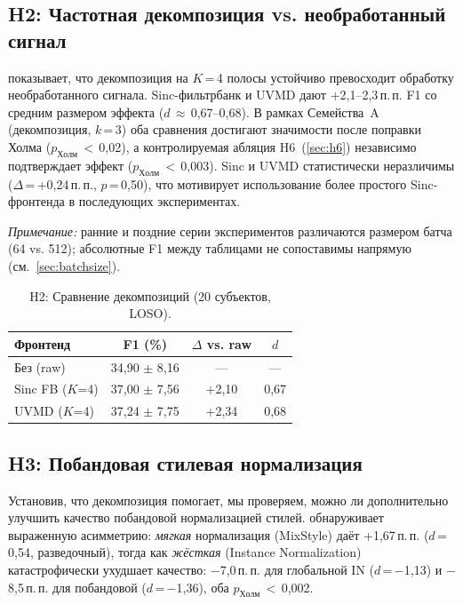 \documentclass[conference]{IEEEtran}
\newcommand{\pp}{\,п.\,п.}
\newcommand{\uvmd}{\textsc{UVMD}}
\begin{document}
\subsection{H2: Частотная декомпозиция vs. необработанный сигнал}

 показывает, что декомпозиция на $K$\,=\,4 полосы устойчиво превосходит обработку необработанного сигнала.
Sinc-фильтрбанк и \uvmd{} дают +2,1--2,3\pp{} F1 со средним размером эффекта ($d$\,$\approx$\,0,67--0,68).
В рамках Семейства~A (декомпозиция, $k$\,=\,3) оба сравнения достигают значимости после поправки Холма ($p_{\mathrm{Холм}}$\,$<$\,0,02), а контролируемая абляция H6~(\cref{sec:h6}) независимо подтверждает эффект ($p_{\mathrm{Холм}}$\,$<$\,0,003).
Sinc и \uvmd{} статистически неразличимы ($\Delta$\,=\,+0,24\pp{}, $p$\,=\,0,50), что мотивирует использование более простого Sinc-фронтенда в последующих экспериментах.

\emph{Примечание:} ранние и поздние серии экспериментов различаются размером батча (64 vs. 512); абсолютные F1 между таблицами не сопоставимы напрямую (см.~\cref{sec:batchsize}).

\begin{table}[t]
\centering
\caption{H2: Сравнение декомпозиций (20 субъектов, LOSO).}
\label{tab:h2}
\begin{tabular}{lccc}
\toprule
Фронтенд & F1 (\%) & $\Delta$ vs. raw & $d$ \\
\midrule
Без (raw) & 34,90 $\pm$ 8,16 & --- & --- \\
Sinc FB ($K$=4) & 37,00 $\pm$ 7,56 & +2,10 & 0,67 \\
\uvmd{} ($K$=4) & 37,24 $\pm$ 7,75 & +2,34 & 0,68 \\
\bottomrule
\end{tabular}
\end{table}

\subsection{H3: Побандовая стилевая нормализация}

Установив, что декомпозиция помогает, мы проверяем, можно ли дополнительно улучшить качество побандовой нормализацией стилей.
 обнаруживает выраженную асимметрию: \emph{мягкая} нормализация (MixStyle) даёт +1,67\pp{} ($d$\,=\,0,54, разведочный), тогда как \emph{жёсткая} (Instance Normalization) катастрофически ухудшает качество: $-$7,0\pp{} для глобальной IN ($d$\,=\,$-$1,13) и $-$8,5\pp{} для побандовой ($d$\,=\,$-$1,36), оба $p_{\mathrm{Холм}}$\,$<$\,0,002.
\end{document}
